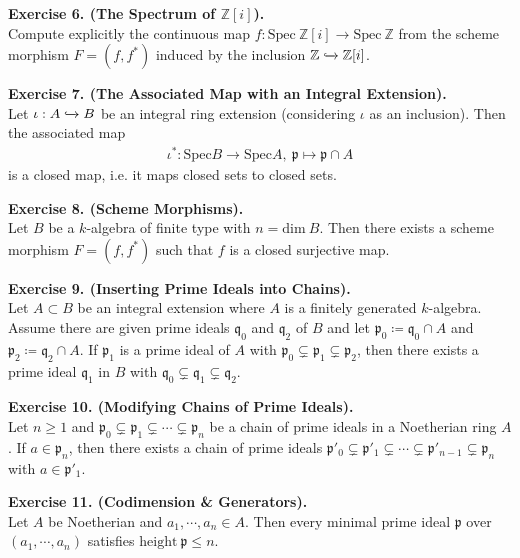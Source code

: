 \documentclass[12pt,a4paper,footinclude=true,headinclude=true]{scrbook} %
\newenvironment{exe}[2][Exercise]
    { \begin{mdframed}[backgroundcolor=gray!20] \textbf{#1 #2.}\\ }
    {  \end{mdframed}}
\begin{document}
\begin{exe}{6. (The Spectrum of $\mathbb{Z}[i]$)}
    Compute explicitly the continuous map $f:\mathrm{Spec}\ \mathbb{Z}[i]\to\mathrm{Spec}\ \mathbb{Z}$ from the scheme morphism $F=(f,f^\ast)$ induced by the inclusion $\mathbb{Z}\xhookrightarrow{} \mathbb{Z}[i]$.
\end{exe}

\begin{exe}{7. (The Associated Map with an Integral Extension)}
    Let $\iota:A\xhookrightarrow{} B$ be an integral ring extension (considering $\iota$ as an inclusion). Then the associated map
    \begin{align*}
        \iota^\ast:\mathrm{Spec}B\longrightarrow\mathrm{Spec}A,\ \mathfrak{p}\longmapsto\mathfrak{p}\cap A
    \end{align*}
    is a closed map, i.e. it maps closed sets to closed sets.
\end{exe}

\begin{exe}{8. (Scheme Morphisms)}
    Let $B$ be a $k$-algebra of finite type with $n=\mathrm{dim}\ B$. Then there exists a scheme morphism $F=(f,f^\ast)$ such that $f$ is a closed surjective map.
\end{exe}

\begin{exe}{9. (Inserting Prime Ideals into Chains)}
    Let $A\subset B$ be an integral extension where $A$ is a finitely generated $k$-algebra. Assume there are given prime ideals $\mathfrak{q}_0$ and $\mathfrak{q}_2$ of $B$ and let $\mathfrak{p}_0\coloneqq\mathfrak{q}_0\cap A$ and $\mathfrak{p}_2\coloneqq\mathfrak{q}_2\cap A$. If $\mathfrak{p}_1$ is a prime ideal of $A$ with $\mathfrak{p}_0\subsetneq\mathfrak{p}_1\subsetneq\mathfrak{p}_2$, then there exists a prime ideal $\mathfrak{q}_1$ in $B$ with $\mathfrak{q}_0\subsetneq\mathfrak{q}_1\subsetneq\mathfrak{q}_2$.
\end{exe}

\begin{exe}{10. (Modifying Chains of Prime Ideals)}
    Let $n\geq1$ and $\mathfrak{p}_0\subsetneq\mathfrak{p}_1\subsetneq\cdots\subsetneq\mathfrak{p}_n$ be a chain of prime ideals in a Noetherian ring $A$. If $a\in\mathfrak{p}_n$, then there exists a chain of prime ideals $\mathfrak{p}'_0\subsetneq\mathfrak{p}'_1\subsetneq\cdots\subsetneq\mathfrak{p}'_{n-1}\subsetneq\mathfrak{p}_n$ with $a\in\mathfrak{p}'_1$.
\end{exe}

\begin{exe}{11. (Codimension \& Generators)}
    Let $A$ be Noetherian and $a_1,\cdots,a_n\in A$. Then every minimal prime ideal $\mathfrak{p}$ over $(a_1,\cdots,a_n)$ satisfies $\mathrm{height}\ \mathfrak{p}\leq n$.
\end{exe}
\end{document}
